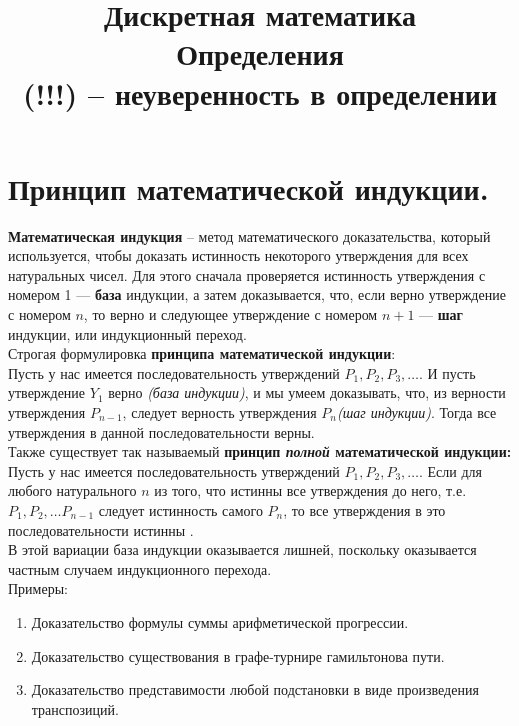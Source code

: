 

\title{Дискретная математика\\Определения\\ (!!!) -- неуверенность в определении}

\maketitle

\section{Принцип математической индукции.}

\textbf{Математическая индукция} -- метод математического доказательства, который используется, чтобы доказать истинность некоторого утверждения для всех натуральных чисел. Для этого сначала проверяется истинность утверждения с номером 1 — \textbf{база} индукции, а затем доказывается, что, если верно утверждение с номером $n$, то верно и следующее утверждение с номером $n + 1$ — \textbf{шаг} индукции, или индукционный переход.\\

Строгая формулировка \textbf{принципа математической индукции}:\\
Пусть у нас имеется последовательность утверждений $P_1, P_2, P_3, \ldots$. И пусть утверждение $Y_1$ верно \textit{(база индукции)}, и мы умеем доказывать, что, из верности утверждения $P_{n-1}$, следует верность утверждения $P_{n}$\textit{(шаг индукции)}. Тогда все утверждения в данной последовательности верны. \\

Также существует так называемый \textbf{принцип \textit{полной} математической индукции:}\\
Пусть у нас имеется последовательность утверждений $P_1, P_2, P_3, \ldots$. Если для любого натурального $n$ из того, что истинны все утверждения до него, т.е. $P_1, P_2, \ldots P_{n-1}$ следует истинность самого $P_n$, то все утверждения в это последовательности истинны . \\
В этой вариации база индукции оказывается лишней, поскольку оказывается частным случаем индукционного перехода.\\

Примеры:
\begin{enumerate}
	\item Доказательство формулы суммы арифметической прогрессии. 
	\item Доказательство существования в графе-турнире гамильтонова пути.
	\item Доказательство представимости любой подстановки в виде произведения транспозиций.
\end{enumerate}


